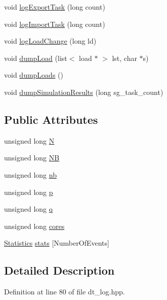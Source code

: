 \begin{DoxyCompactItemize}
void \hyperlink{class_ductteip_log_a8a3a26ac412cb874ea28fb9ea8a42535}{logExportTask} (long count)
\item 
void \hyperlink{class_ductteip_log_adcec387e3a205d72e92baba0ea3019c1}{logImportTask} (long count)
\item 
void \hyperlink{class_ductteip_log_acd0bf80ce85006d33a78318bd79a060a}{logLoadChange} (long ld)
\item 
void \hyperlink{class_ductteip_log_a4e66deabb0265c848d13f6dc99cd52e0}{dumpLoad} (list$<$ load $\ast$ $>$ lst, char $\ast$s)
\item 
void \hyperlink{class_ductteip_log_a26e1bca52b880675a247a54cca4a6b1f}{dumpLoads} ()
\item 
void \hyperlink{class_ductteip_log_af6f835d866e252bb637b95f75e816835}{dumpSimulationResults} (long sg\_\-task\_\-count)
\end{DoxyCompactItemize}
\subsection*{Public Attributes}
\begin{DoxyCompactItemize}
\item 
unsigned long \hyperlink{class_ductteip_log_ae26d79785cddd22afd0ef968ed54cdba}{N}
\item 
unsigned long \hyperlink{class_ductteip_log_a3cc06c9c2b21c0a3fa306e32b7935d18}{NB}
\item 
unsigned long \hyperlink{class_ductteip_log_a12b797b756a43b05d3cd088678a42a0e}{nb}
\item 
unsigned long \hyperlink{class_ductteip_log_a6009ec1dd40a5e1e6244ac6294ba5cf3}{p}
\item 
unsigned long \hyperlink{class_ductteip_log_a200ae8fc4dd3645f8227adc0f5fd16aa}{q}
\item 
unsigned long \hyperlink{class_ductteip_log_a1495cf729c4097e29382d4566257fb2d}{cores}
\item 
\hyperlink{struct_statistics}{Statistics} \hyperlink{class_ductteip_log_aef20239edd3dbb2d80ce65be13689f20}{stats} \mbox{[}NumberOfEvents\mbox{]}
\end{DoxyCompactItemize}


\subsection{Detailed Description}


Definition at line 80 of file dt\_\-log.hpp.

